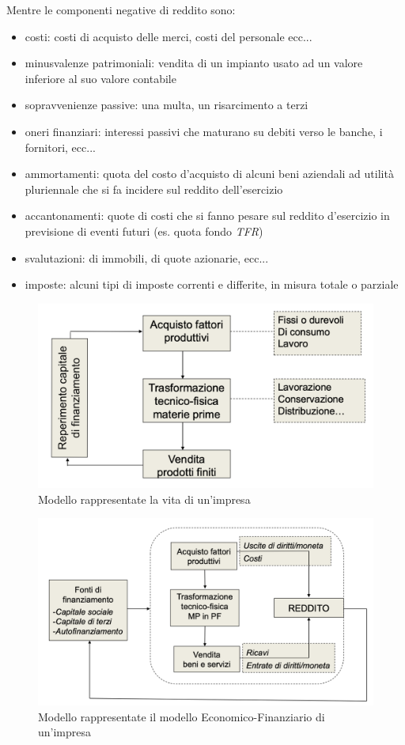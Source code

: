 Mentre le componenti negative di reddito sono:
\begin{itemize}
	\item costi: costi di acquisto delle merci, costi del personale ecc...
	\item minusvalenze patrimoniali: vendita di un impianto usato ad un valore inferiore al suo valore contabile
	\item sopravvenienze passive: una multa, un risarcimento a terzi
	\item oneri finanziari: interessi passivi che maturano su debiti verso le banche, i fornitori, ecc...
	\item ammortamenti: quota del costo d’acquisto di alcuni beni aziendali ad utilità pluriennale che si fa incidere sul reddito dell’esercizio
	\item accantonamenti: quote di costi che si fanno pesare sul reddito d’esercizio in previsione di eventi futuri (es. quota fondo \textit{TFR})
	\item svalutazioni: di immobili, di quote azionarie, ecc...
	\item imposte: alcuni tipi di imposte correnti e differite, in misura totale o parziale
\end{itemize}

\begin{center}

\begin{figure}[H]
	\includegraphics[width=0.8\linewidth]{resources/chapters/Bilancio/images/vita-impresa.png}
	\centering
	\caption{Modello rappresentate la vita di un'impresa}
\end{figure}

\begin{figure}[H]
	\includegraphics[width=0.8\linewidth]{resources/chapters/Bilancio/images/modello-economico-finanziario.png}
	\centering
	\caption{Modello rappresentate il modello Economico-Finanziario di un'impresa}
\end{figure}
\end{center}


